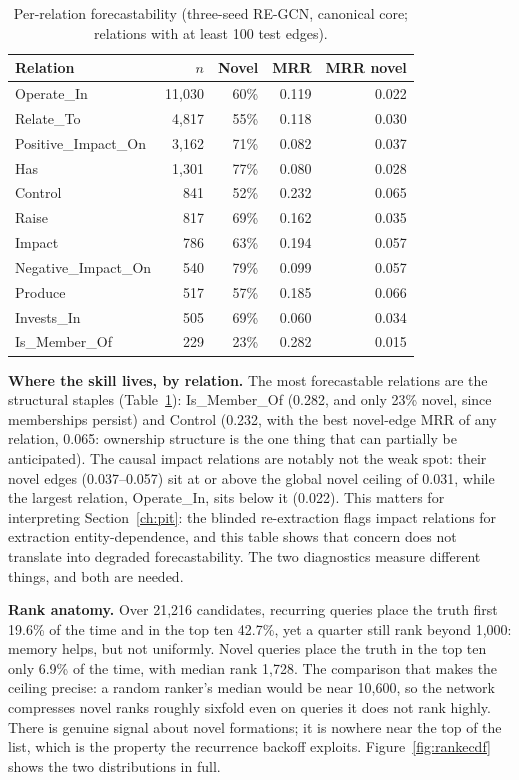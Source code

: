 \documentclass[a4paper,12pt]{report}
\begin{document}
\begin{table}[ht]
\centering
\caption{Per-relation forecastability (three-seed RE-GCN, canonical core;
relations with at least 100 test edges).}
\label{tab:perrel}
\begin{tabular}{lrrrr}
\toprule
Relation & $n$ & Novel & MRR & MRR novel \\
\midrule
Operate\_In & 11{,}030 & 60\% & 0.119 & 0.022 \\
Relate\_To & 4{,}817 & 55\% & 0.118 & 0.030 \\
Positive\_Impact\_On & 3{,}162 & 71\% & 0.082 & 0.037 \\
Has & 1{,}301 & 77\% & 0.080 & 0.028 \\
Control & 841 & 52\% & 0.232 & 0.065 \\
Raise & 817 & 69\% & 0.162 & 0.035 \\
Impact & 786 & 63\% & 0.194 & 0.057 \\
Negative\_Impact\_On & 540 & 79\% & 0.099 & 0.057 \\
Produce & 517 & 57\% & 0.185 & 0.066 \\
Invests\_In & 505 & 69\% & 0.060 & 0.034 \\
Is\_Member\_Of & 229 & 23\% & 0.282 & 0.015 \\
\bottomrule
\end{tabular}
\end{table}

\textbf{Where the skill lives, by relation.} The most forecastable
relations are the structural staples (Table~\ref{tab:perrel}):
Is\_Member\_Of (0.282, and only 23\% novel, since memberships persist) and
Control (0.232, with the best novel-edge MRR of any relation, 0.065:
ownership structure is the one thing that can partially be anticipated).
The causal impact relations are notably not the weak spot: their
novel edges (0.037--0.057) sit at or above the global novel ceiling of
0.031, while the largest relation, Operate\_In, sits below it (0.022). This
matters for interpreting Section~\ref{ch:pit}: the blinded re-extraction
flags impact relations for extraction entity-dependence, and this table
shows that concern does not translate into degraded forecastability. The
two diagnostics measure different things, and both are needed.

\textbf{Rank anatomy.} Over 21{,}216 candidates, recurring queries place
the truth first 19.6\% of the time and in the top ten 42.7\%, yet a quarter
still rank beyond 1{,}000: memory helps, but not uniformly. Novel queries
place the truth in the top ten only 6.9\% of the time, with median rank
1{,}728. The comparison that makes the ceiling precise: a random ranker's
median would be near 10{,}600, so the network compresses novel ranks
roughly sixfold even on queries it does not rank highly. There is
genuine signal about novel
formations; it is nowhere near the top of the list, which is the
property the recurrence backoff exploits.
Figure~\ref{fig:rankecdf} shows the two distributions in full.
\end{document}

